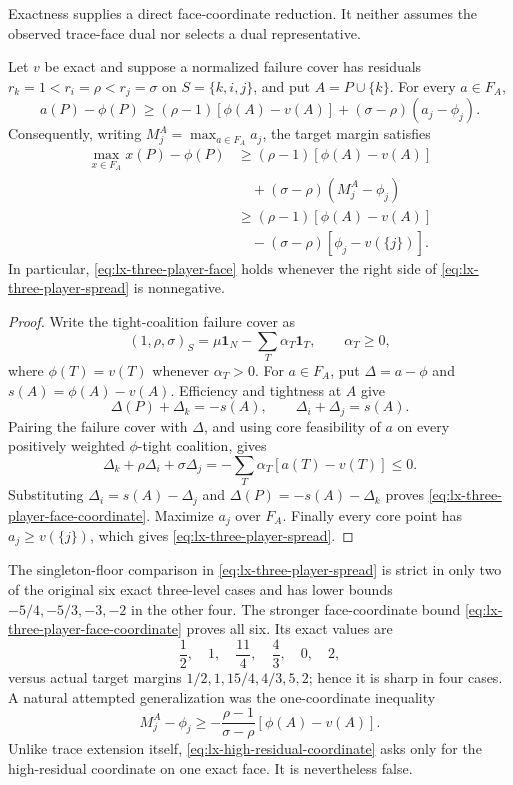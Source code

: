Exactness supplies a direct face-coordinate reduction.  It neither assumes the
observed trace-face dual nor selects a dual representative.

\begin{lemma}
\label{lem:lx-three-player-spread}
Let $v$ be exact and suppose a normalized failure cover has residuals
$r_k=1<r_i=\rho<r_j=\sigma$ on $S=\{k,i,j\}$, and put
$A=P\cup\{k\}$.  For every $a\in F_A$,
\[
 a(P)-\phi(P)
 \geq(\rho-1)[\phi(A)-v(A)]
      +(\sigma-\rho)(a_j-\phi_j).             \tag{FC}
 \label{eq:lx-three-player-face-coordinate}
\]
Consequently, writing $M_j^A=\max_{a\in F_A}a_j$, the target margin satisfies
\[
 \begin{aligned}
 \max_{x\in F_A}x(P)-\phi(P)
 &\geq (\rho-1)[\phi(A)-v(A)]\\
 &\quad +(\sigma-\rho)(M_j^A-\phi_j)\\
 &\geq (\rho-1)[\phi(A)-v(A)]\\
 &\quad -(\sigma-\rho)[\phi_j-v(\{j\})].
 \end{aligned}                                      \tag{RS}
 \label{eq:lx-three-player-spread}
\]
In particular, \eqref{eq:lx-three-player-face} holds whenever the right side of
\eqref{eq:lx-three-player-spread} is nonnegative.
\end{lemma}

\begin{proof}
Write the tight-coalition failure cover as
\[
 (1,\rho,\sigma)_S
 =\mu\mathbf1_N-\sum_T\alpha_T\mathbf1_T,
 \qquad \alpha_T\geq0,
\]
where $\phi(T)=v(T)$ whenever $\alpha_T>0$.  For $a\in F_A$, put
$\Delta=a-\phi$ and
$s(A)=\phi(A)-v(A)$.  Efficiency and tightness at $A$ give
\[
 \Delta(P)+\Delta_k=-s(A),\qquad
 \Delta_i+\Delta_j=s(A).
\]
Pairing the failure cover with $\Delta$, and using core feasibility of $a$ on
every positively weighted $\phi$-tight coalition, gives
\[
 \Delta_k+\rho\Delta_i+\sigma\Delta_j
 =-\sum_T\alpha_T[a(T)-v(T)]\leq0.
\]
Substituting $\Delta_i=s(A)-\Delta_j$ and
$\Delta(P)=-s(A)-\Delta_k$ proves
\eqref{eq:lx-three-player-face-coordinate}.  Maximize $a_j$ over $F_A$.
Finally every core point has $a_j\geq v(\{j\})$, which gives
\eqref{eq:lx-three-player-spread}.
\end{proof}

The singleton-floor comparison in \eqref{eq:lx-three-player-spread} is strict
in only two of the original six exact three-level cases and has lower bounds
$-5/4,-5/3,-3,-2$ in the other four.  The stronger face-coordinate bound
\eqref{eq:lx-three-player-face-coordinate} proves all six.  Its exact values
are
\[
 \frac12,\quad1,\quad\frac{11}{4},\quad\frac43,\quad0,\quad2,
\]
versus actual target margins
$1/2,1,15/4,4/3,5,2$; hence it is sharp in four cases.  A natural attempted
generalization was the one-coordinate inequality
\[
 M_j^A-\phi_j
 \geq-\frac{\rho-1}{\sigma-\rho}[\phi(A)-v(A)]. \tag{HC}
 \label{eq:lx-high-residual-coordinate}
\]
Unlike trace extension itself, \eqref{eq:lx-high-residual-coordinate} asks only
for the high-residual coordinate on one exact face.  It is nevertheless false.

